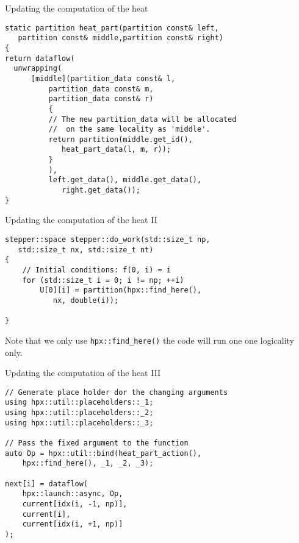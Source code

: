 \documentclass[12pt,t]{beamer}
\begin{document}
\begin{frame}[fragile]{Updating the computation of the heat}

\begin{lstlisting}
static partition heat_part(partition const& left, 
   partition const& middle,partition const& right)
{
return dataflow(
  unwrapping(
      [middle](partition_data const& l, 
          partition_data const& m,
          partition_data const& r)
          {
          // The new partition_data will be allocated
          //  on the same locality as 'middle'.
          return partition(middle.get_id(), 
             heat_part_data(l, m, r));
          }
          ),
          left.get_data(), middle.get_data(), 
             right.get_data());
}
\end{lstlisting}

\end{frame}

\begin{frame}[fragile]{Updating the computation of the heat II}

\begin{lstlisting}
stepper::space stepper::do_work(std::size_t np, 
   std::size_t nx, std::size_t nt)
{
    // Initial conditions: f(0, i) = i
    for (std::size_t i = 0; i != np; ++i)
        U[0][i] = partition(hpx::find_here(), 
           nx, double(i));

}
\end{lstlisting}
\vspace{0.25cm}
Note that we only use \lstinline|hpx::find_here()| the code will run one one logicality only.
\end{frame}

\begin{frame}[fragile]{Updating the computation of the heat III}

\begin{lstlisting}
// Generate place holder dor the changing arguments
using hpx::util::placeholders::_1;
using hpx::util::placeholders::_2;
using hpx::util::placeholders::_3;

// Pass the fixed argument to the function
auto Op = hpx::util::bind(heat_part_action(), 
    hpx::find_here(), _1, _2, _3);
    
next[i] = dataflow(
    hpx::launch::async, Op,
    current[idx(i, -1, np)], 
    current[i], 
    current[idx(i, +1, np)]
);
\end{lstlisting}

\end{frame}
\end{document}
